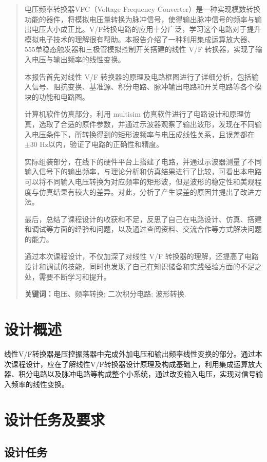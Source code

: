 \documentclass[12pt]{article}
\begin{document}
\begin{abstract}
电压频率转换器VFC（Voltage Frequency Converter）是一种实现模数转换功能的器件，将模拟电压量转换为脉冲信号，使得输出脉冲信号的频率与输出电压大小成正比。V/F转换电路的应用十分广泛，学习这个电路对于提升模拟电子技术的理解很有帮助。本报告介绍了一种利用集成运算放大器、555单稳态触发器和三极管模拟控制开关搭建的线性 V/F 转换器，实现了输入电压与输出频率的线性变换。

本报告首先对线性 V/F 转换器的原理及电路框图进行了详细分析，包括输入信号、阻抗变换、基准源、积分电路、脉冲输出电路和开关电路等各个模块的功能和电路图。

计算机软件仿真部分，利用 multisim 仿真软件进行了电路设计和原理仿真，选取了合适的原件参数，并通过示波器观察了输出波形，发现在不同输入电压条件下，所转换得到的矩形波频率与电压成线性关系，且误差都在$\pm 30$ Hz以内，验证了电路的正确性和精度。

实际组装部分，在线下的硬件平台上搭建了电路，并通过示波器测量了不同输入信号下的输出频率，与理论分析和仿真结果进行了比较，可看出本电路可以将不同输入电压转换为对应频率的矩形波，但是波形的稳定性和美观程度与仿真结果有较大的差异。对此，分析了产生误差的原因并提出了改进方法。

最后，总结了课程设计的收获和不足，反思了自己在电路设计、仿真、搭建和调试等方面的经验和问题，以及通过查阅资料、交流合作等方式解决问题的能力。

通过本次课程设计，不仅加深了对线性 V/F 转换器的理解，还提高了电路设计和调试的技能，同时也发现了自己在知识储备和实践经验方面的不足之处，需要不断学习和提升。
\par\textbf{关键词：}电压、频率转换; 二次积分电路; 波形转换. 
\end{abstract}   

\newpage
\tableofcontents
 
\section{设计概述}

线性V/F转换器是压控振荡器中完成外加电压和输出频率线性变换的部分。通过本次课程设计，应在了解线性V/F转换器设计原理及构成基础上，利用集成运算放大器、积分电路以及脉冲电路等构成整个小系统，通过改变输入电压，实现对信号输入频率的线性变换。

\section{设计任务及要求}

\subsection{设计任务}
\end{document}
